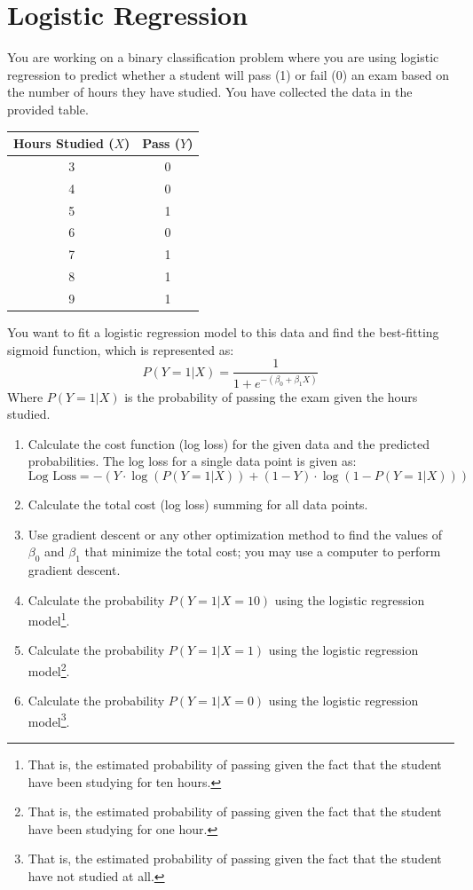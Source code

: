 \documentclass[]{article}
\begin{document}
	
	
	
	\section{Logistic Regression}
	You are working on a binary classification problem where you are using logistic regression to predict whether a student will pass (1) or fail (0) an exam based on the number of hours they have studied. You have collected the data in the provided table.
	
	\begin{table}[h!]
		\centering
		\begin{tabular}{|c|c|}
			\hline
			Hours Studied ($X$) & Pass ($Y$) \\
			\hline
			3 & 0 \\
			4 & 0 \\
			5 & 1 \\
			6 & 0 \\
			7 & 1 \\
			8 & 1 \\
			9 & 1 \\
			\hline
		\end{tabular}
	\end{table}
	
	You want to fit a logistic regression model to this data and find the best-fitting sigmoid function, which is represented as:
	$$P(Y=1|X) = \frac{1}{1 + e^{-(\beta_0 + \beta_1X)}}$$
	Where $P(Y=1|X)$ is the probability of passing the exam given the hours studied.
	
	\begin{enumerate}
		\item Calculate the cost function (log loss) for the given data and the predicted probabilities. The log loss for a single data point is given as:
		$$\text{Log Loss} = -\left(Y \cdot \log(P(Y=1|X)) + (1 - Y) \cdot \log(1 - P(Y=1|X))\right)$$
		\item Calculate the total cost (log loss) summing for all data points.
		\item Use gradient descent or any other optimization method to find the values of $\beta_0$ and $\beta_1$ that minimize the total cost; you may use a computer to perform gradient descent.
		\item Calculate the probability $P(Y=1|X=10)$ using the logistic regression model\footnote{That is, the estimated probability of passing given the fact that the student have been studying for ten hours.}.
		\item Calculate the probability $P(Y=1|X=1)$ using the logistic regression model\footnote{That is, the estimated probability of passing given the fact that the student have been studying for one hour.}.
		\item Calculate the probability $P(Y=1|X=0)$ using the logistic regression model\footnote{That is, the estimated probability of passing given the fact that the student have not studied at all.}.
	\end{enumerate}
	
	
\end{document}
